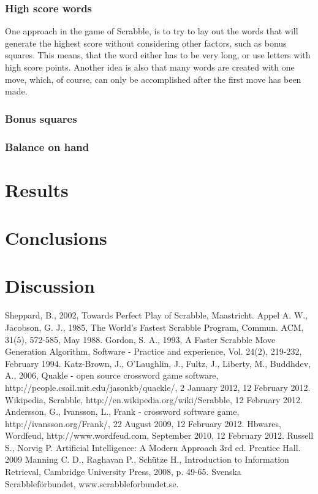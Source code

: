 \documentclass[a4paper, 12pt]{report}
\begin{document}
\subsection{High score words}
One approach in the game of Scrabble, is to try to lay out the words that will generate the highest score without considering other factors, such as bonus squares. This means, that the word either has to be very long, or use letters with high score points. Another idea is also that many words are created with one move, which, of course, can only be accomplished after the first move has been made.
\subsection{Bonus squares}
\subsection{Balance on hand}
\chapter{Results}
\chapter{Conclusions}
\chapter{Discussion}


\begin{thebibliography}{100}  
   Sheppard, B., 2002, Towards Perfect Play of Scrabble, Maastricht.
   Appel A. W., Jacobson, G. J., 1985, The World’s Fastest Scrabble Program, Commun. ACM, 31(5), 572-585, May 1988.
 Gordon, S. A., 1993, A Faster Scrabble Move Generation Algorithm, Software - Practice and experience, Vol. 24(2), 219-232, February 1994.
 Katz-Brown, J., O’Laughlin, J., Fultz, J., Liberty, M., Buddhdev, A., 2006, Quakle - open source crossword game software, http://people.csail.mit.edu/jasonkb/quackle/, 2 January 2012,  12 February 2012.
 Wikipedia, Scrabble, http://en.wikipedia.org/wiki/Scrabble, 12 February 2012.
 Andersson, G., Ivansson, L., Frank - crossword software game, http://ivansson.org/Frank/, 22 August 2009, 12 February 2012.
 Hbwares, Wordfeud, http://www.wordfeud.com, September 2010, 12 February 2012.
 Russell S., Norvig P. Artificial Intelligence: A Modern Approach 3rd ed. Prentice Hall. 2009
 Manning C. D., Raghavan P., Schütze H., Introduction to Information Retrieval, Cambridge University Press, 2008, p. 49-65.
 Svenska Scrabbleförbundet, www.scrabbleforbundet.se.
\end{thebibliography}
\end{document}
